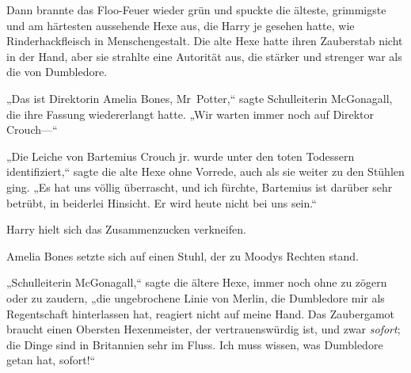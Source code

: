 Dann brannte das Floo-Feuer wieder grün und spuckte die älteste, grimmigste und am härtesten aussehende Hexe aus, die Harry je gesehen hatte, wie Rinderhackfleisch in Menschengestalt. Die alte Hexe hatte ihren Zauberstab nicht in der Hand, aber sie strahlte eine Autorität aus, die stärker und strenger war als die von Dumbledore.

„Das ist Direktorin Amelia Bones, Mr~Potter,“ sagte Schulleiterin McGonagall, die ihre Fassung wiedererlangt hatte. „Wir warten immer noch auf Direktor Crouch—“

„Die Leiche von Bartemius Crouch jr. wurde unter den toten Todessern identifiziert,“ sagte die alte Hexe ohne Vorrede, auch als sie weiter zu den Stühlen ging.
„Es hat uns völlig überrascht, und ich fürchte, Bartemius ist darüber sehr betrübt, in beiderlei Hinsicht. Er wird heute nicht bei uns sein.“

Harry hielt sich das Zusammenzucken verkneifen.

Amelia Bones setzte sich auf einen Stuhl, der zu Moodys Rechten stand.

„Schulleiterin McGonagall,“ sagte die ältere Hexe, immer noch ohne zu zögern oder zu zaudern, „die ungebrochene Linie von Merlin, die Dumbledore mir als Regentschaft hinterlassen hat, reagiert nicht auf meine Hand. Das Zaubergamot braucht einen Obersten Hexenmeister, der vertrauenswürdig ist, und zwar \emph{sofort}; die Dinge sind in Britannien sehr im Fluss. Ich muss wissen, was Dumbledore getan hat, sofort!“

